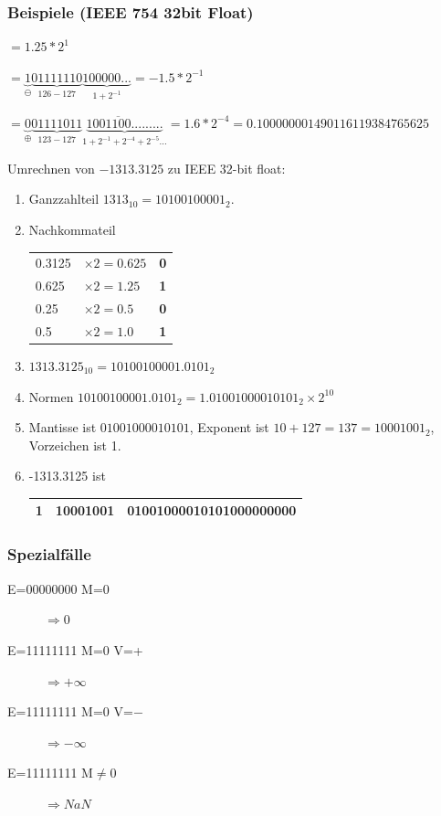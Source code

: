 \documentclass[a4paper,10pt]{article}
\newcommand{\Bold}[1]{\textbf{#1}} %
\begin{document}
\subsubsection{Beispiele (IEEE 754 32bit Float)}
\begin{description}
	\item[2.5] $=1.25*2^1$
	\item[-0.75] $=\underbrace{1}_{\ominus}\underbrace{01111110}_{126 - 127} \underbrace{100000...}_{1+2^{-1}}=-1.5*2^{-1}$
	\item[0.1] $=\underbrace{0}_{\oplus}\underbrace{01111011}_{123 - 127} \underbrace{100\overline{1100}.........}_{1+2^{-1}+2^{-4}+2^{-5}...}=1.6*2^{-4} = 0.100000001490116119384765625$ 
	\item Umrechnen von $-1313.3125$ zu IEEE 32-bit float:
	\begin{enumerate}
		\item Ganzzahlteil $1313_{10}=10100100001_2.$
		\item Nachkommateil\\
		\begin{tabular}{lll}
			0.3125&$\times2=0.625$& \Bold{0}\\
			0.625&$\times 2=1.25$ &\Bold{1}\\
			0.25&$\times 2 = 0.5$ &\Bold{0}\\
			0.5&$\times 2=1.0$ &\Bold{1}\\
		\end{tabular}
		\item $1313.3125_{10}=10100100001.0101_2$
		\item Normen $10100100001.0101_2=1.01001000010101_2\times2^{10}$
		\item Mantisse ist $01001000010101$, Exponent ist $10 + 127 = 137 = 10001001_2$, Vorzeichen ist 1.
		\item -1313.3125 ist 
		\begin{tabular}{|c|l|l|}
			\hline
			1 & 10001001 & 01001000010101000000000 \\
			\hline
		\end{tabular}
	\end{enumerate} 
\end{description}

\subsubsection{Spezialf\"alle}
\begin{description}
	\item[E=00000000 M=0] $\Rightarrow 0$
	\item[E=11111111 M=0 V=+] $\Rightarrow +\infty$
	\item[E=11111111 M=0 V=$-$] $\Rightarrow -\infty$
	\item[E=11111111 M$\neq$0] $\Rightarrow NaN$
\end{description}
\end{document}
